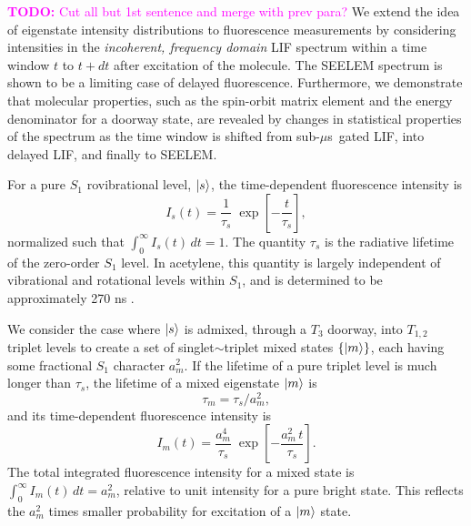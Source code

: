 \documentclass[12pt]{mitthesis}
\newcommand{\TODO} [1]{\textcolor{magenta}{\textbf{TODO:} #1}}
\newcommand{\microsec}{$\mu$s}
\begin{document}
\TODO{Cut all but 1st sentence and merge with prev para?}  We extend
the idea of eigenstate intensity distributions to fluorescence
measurements by considering intensities in the \emph{incoherent,
  frequency domain} LIF spectrum within a time window $t$ to $t+dt$
after excitation of the molecule.  The SEELEM spectrum is shown to be
a limiting case of delayed fluorescence.  Furthermore, we demonstrate
that molecular properties, such as the spin-orbit matrix element and
the energy denominator for a doorway state, are revealed by changes in
statistical properties of the spectrum as the time window is shifted
from sub-\microsec\ gated LIF, into delayed LIF, and finally to
SEELEM.

For a pure $S_1$ rovibrational level, $\mathinner{|{s}\rangle}$, the time-dependent
fluorescence intensity is
\begin{equation}
  I_s(t) = \frac{1}{\tau_s} \;
           \exp \left[
             -\frac{t}{ \tau_s} 
           \right],
\end{equation}
normalized such that $\int_0^{\infty} I_s(t) \, dt = 1$.  The quantity
$\tau_s$ is the radiative lifetime of the zero-order $S_1$ level.  In
acetylene, this quantity is largely independent of vibrational and
rotational levels within $S_1$, and is determined to be approximately
270 ns \cite{ochi91, stephenson84}.

We consider the case where $\mathinner{|{s}\rangle}$ is admixed, through a $T_3$
doorway, into $T_{1,2}$ triplet levels to create a set of
singlet$\sim$triplet mixed states $\lbrace\mathinner{|{m}\rangle}\rbrace$, each having
some fractional $S_1$ character $a_m^2$.  If the lifetime of a pure
triplet level is much longer than $\tau_s$, the lifetime of a mixed
eigenstate $\mathinner{|{m}\rangle}$ is
\begin{equation}
  \label{eq:tau-m}
  \tau_m = \tau_s / a_m^2,
\end{equation}
and its time-dependent fluorescence intensity is
\begin{equation}
  \label{eq:int-m}
  I_m(t) = \frac{a_m^4}{\tau_s} \;
           \exp \left[
             -\frac{a_m^2 \, t}{\tau_s} 
           \right].
\end{equation}
The total integrated fluorescence intensity for a mixed state is
$\int_0^{\infty} I_m(t) \, dt = a_m^2$, relative to unit intensity for
a pure bright state.  This reflects the $a_m^2$ times smaller
probability for excitation of a $\mathinner{|{m}\rangle}$ state.

\end{document}
